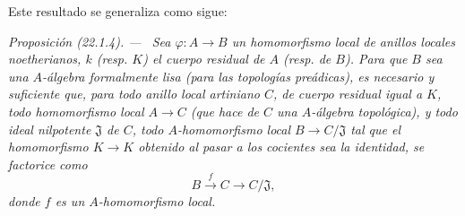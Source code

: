 \documentclass[10pt,oneside]{book}
\makeatletter
\newcommand{\setmanualcurrentlabel}[1]{\def\@currentlabel{#1}}
\newcommand{\oldpage}[2][]{%
  \setcounter{footnote}{0}%
  \marginpar{\scriptsize\textbf{#1}~|~#2}\ignorespaces}
\newenvironment{proposition}[1][]{%
  \setmanualcurrentlabel{#1}\par\medskip\noindent\itshape Proposición (#1). ---\ }{\par}
\makeatother
\begin{document}
\oldpage[0\textsubscript{IV-1}]{185}

Este resultado se generaliza como sigue:

\begin{proposition}[22.1.4]
\label{0.22.1.4-es}
Sea $\varphi:A\to B$ un homomorfismo local de anillos locales noetherianos,
$k$ \textup{(resp. $K$)} el cuerpo residual de $A$ \textup{(resp. de $B$)}. Para que $B$ sea una
$A$-álgebra formalmente lisa (para las topologías preádicas), es necesario y
suficiente que, para todo anillo local \textup{artiniano} $C$, de cuerpo residual \textup{igual
a} $K$, todo homomorfismo local $A\to C$ (que hace de $C$ una $A$-álgebra
topológica), y todo ideal nilpotente $\mathfrak J$ de $C$, todo
$A$-homomorfismo local $B\to C/\mathfrak J$ tal que el homomorfismo
$K\to K$ obtenido al pasar a los cocientes sea la identidad, se factorice como
\[
  B\xrightarrow{f}C\longrightarrow C/\mathfrak J,
\]
donde $f$ es un $A$-homomorfismo local.
\end{proposition}
\end{document}

